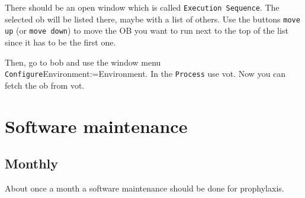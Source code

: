 \documentclass[11pt,fleqn,a4paper]{book}
\makeatletter
\def\menu#1#2{\texttt{#1}\ifx{}#2\else\@for\@x:=#2\do{$\rightarrow$\texttt{\@x}}\fi}
\def\wmenu#1#2{window menu \menu{#1}{#2}}
\makeatother
\begin{document}
There should be an open window which is called \texttt{Execution Sequence}. The selected \gls{ob} will be listed there, maybe with a list of others. Use the buttons \texttt{move up} (or \texttt{move down})  to move the OB you want to run next to the top of the list since it has to be the first one.

Then, go to \gls{bob} and use the \wmenu{Configure}{Environment}. In the \texttt{Process} use \gls{vot}. Now you can fetch the \gls{ob} from \gls{vot}.




\chapter{Software maintenance}
\label{chap:reboots}

\section{Monthly}

About once a month a software maintenance should be done for prophylaxis.
\end{document}
